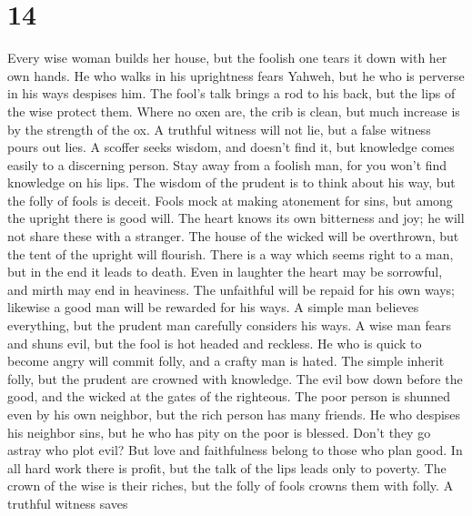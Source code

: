\hypertarget{section-13}{%
\section{14}\label{section-13}}

 Every wise woman builds her house, but the foolish one
tears it down with her own hands.  He who walks in his
uprightness fears Yahweh, but he who is perverse in his ways despises
him.  The fool's talk brings a rod to his back, but the lips
of the wise protect them.  Where no oxen are, the crib is
clean, but much increase is by the strength of the ox.  A
truthful witness will not lie, but a false witness pours out lies.
 A scoffer seeks wisdom, and doesn't find it, but knowledge
comes easily to a discerning person.  Stay away from a
foolish man, for you won't find knowledge on his lips.  The
wisdom of the prudent is to think about his way, but the folly of fools
is deceit.  Fools mock at making atonement for sins, but
among the upright there is good will.  The heart knows its
own bitterness and joy; he will not share these with a stranger.
 The house of the wicked will be overthrown, but the tent
of the upright will flourish.  There is a way which seems
right to a man, but in the end it leads to death.  Even in
laughter the heart may be sorrowful, and mirth may end in heaviness.
 The unfaithful will be repaid for his own ways; likewise a
good man will be rewarded for his ways.  A simple man
believes everything, but the prudent man carefully considers his ways.
 A wise man fears and shuns evil, but the fool is hot
headed and reckless.  He who is quick to become angry will
commit folly, and a crafty man is hated.  The simple
inherit folly, but the prudent are crowned with knowledge. 
The evil bow down before the good, and the wicked at the gates of the
righteous.  The poor person is shunned even by his own
neighbor, but the rich person has many friends.  He who
despises his neighbor sins, but he who has pity on the poor is blessed.
 Don't they go astray who plot evil? But love and
faithfulness belong to those who plan good.  In all hard
work there is profit, but the talk of the lips leads only to poverty.
 The crown of the wise is their riches, but the folly of
fools crowns them with folly.  A truthful witness saves

